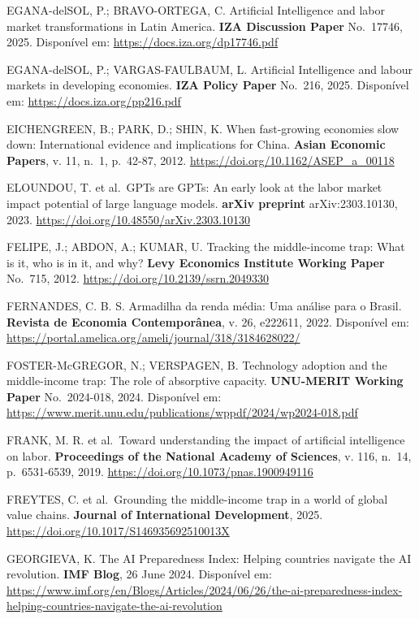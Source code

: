 \documentclass[
  brazilian,
  12pt,
]{article}
\begin{document}
EGANA-delSOL, P.; BRAVO-ORTEGA, C. Artificial Intelligence and labor market transformations in Latin America. \textbf{IZA Discussion Paper} No.~17746, 2025. Disponível em: \url{https://docs.iza.org/dp17746.pdf}

EGANA-delSOL, P.; VARGAS-FAULBAUM, L. Artificial Intelligence and labour markets in developing economies. \textbf{IZA Policy Paper} No.~216, 2025. Disponível em: \url{https://docs.iza.org/pp216.pdf}

EICHENGREEN, B.; PARK, D.; SHIN, K. When fast-growing economies slow down: International evidence and implications for China. \textbf{Asian Economic Papers}, v. 11, n.~1, p.~42-87, 2012. \url{https://doi.org/10.1162/ASEP_a_00118}

ELOUNDOU, T. et al.~GPTs are GPTs: An early look at the labor market impact potential of large language models. \textbf{arXiv preprint} arXiv:2303.10130, 2023. \url{https://doi.org/10.48550/arXiv.2303.10130}

FELIPE, J.; ABDON, A.; KUMAR, U. Tracking the middle-income trap: What is it, who is in it, and why? \textbf{Levy Economics Institute Working Paper} No.~715, 2012. \url{https://doi.org/10.2139/ssrn.2049330}

FERNANDES, C. B. S. Armadilha da renda média: Uma análise para o Brasil. \textbf{Revista de Economia Contemporânea}, v. 26, e222611, 2022. Disponível em: \url{https://portal.amelica.org/ameli/journal/318/3184628022/}

FOSTER-McGREGOR, N.; VERSPAGEN, B. Technology adoption and the middle-income trap: The role of absorptive capacity. \textbf{UNU-MERIT Working Paper} No.~2024-018, 2024. Disponível em: \url{https://www.merit.unu.edu/publications/wppdf/2024/wp2024-018.pdf}

FRANK, M. R. et al.~Toward understanding the impact of artificial intelligence on labor. \textbf{Proceedings of the National Academy of Sciences}, v. 116, n.~14, p.~6531-6539, 2019. \url{https://doi.org/10.1073/pnas.1900949116}

FREYTES, C. et al.~Grounding the middle-income trap in a world of global value chains. \textbf{Journal of International Development}, 2025. \url{https://doi.org/10.1017/S146935692510013X}

GEORGIEVA, K. The AI Preparedness Index: Helping countries navigate the AI revolution. \textbf{IMF Blog}, 26 June 2024. Disponível em: \url{https://www.imf.org/en/Blogs/Articles/2024/06/26/the-ai-preparedness-index-helping-countries-navigate-the-ai-revolution}
\end{document}
